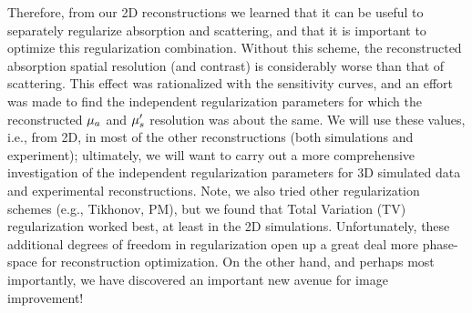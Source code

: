 Therefore, from our 2D reconstructions we learned that it can be useful to separately regularize absorption and scattering, and that it is important to optimize this regularization combination. Without this scheme, the reconstructed absorption spatial resolution (and contrast) is considerably worse than that of scattering. This effect was rationalized with the sensitivity curves, and an effort was made to find the independent regularization parameters for which the reconstructed $\mu_a$ and $\mu_s^{\prime}$ resolution was about the same. We will use these values, i.e., from 2D, in most of the other reconstructions (both simulations and experiment); ultimately, we will want to carry out a more comprehensive investigation of the independent regularization parameters for 3D simulated data and experimental reconstructions. Note, we also tried other regularization schemes (e.g., Tikhonov, PM), but we found that Total Variation (TV) regularization worked best, at least in the 2D simulations. Unfortunately, these additional degrees of freedom in regularization open up a great deal more phase-space for reconstruction optimization. On the other hand, and perhaps most importantly, we have discovered an important new avenue for image improvement!
%
